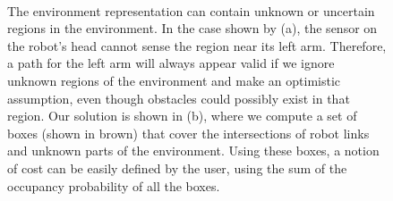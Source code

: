 \begin{figure}[htbp]
\mbox{
\quad
{}
}
\caption[Comparison between the planning algorithms considering and not considering environment uncertainty]{\label{fig:8:unknowncollision} The environment representation can contain unknown
  or uncertain regions in the environment. In the case shown by (a),
  the sensor on the robot's head cannot sense the region near its left
  arm. Therefore, a path for the left arm will always appear
  valid if we ignore unknown regions of the environment and make an optimistic
  assumption, even though obstacles could possibly exist in that
  region. Our solution is shown in (b), where we compute a set of
  boxes (shown in brown) that cover the intersections of robot links
  and unknown parts of the environment. Using these boxes, a notion of
  cost can be easily defined by the user, using the sum of the occupancy probability of all the boxes. }
\end{figure}





